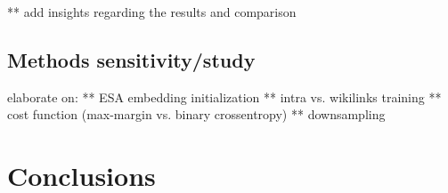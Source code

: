 \documentclass[11pt]{article}
\begin{document}
	** add insights regarding the results and comparison
	\subsection{Methods sensitivity/study}
	
	elaborate on: \newline
	** ESA embedding initialization \newline
	** intra vs. wikilinks training \newline
	** cost function (max-margin vs. binary crossentropy) \newline
	** downsampling
	
	\section{Conclusions}
	
	
	
	
\end{document}
